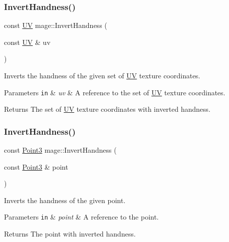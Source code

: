 \subsubsection{\texorpdfstring{Invert\+Handness()}{InvertHandness()}\hspace{0.1cm}{\footnotesize\ttfamily [1/4]}}
{\footnotesize\ttfamily const \hyperlink{structmage_1_1_u_v}{UV} mage\+::\+Invert\+Handness (\begin{DoxyParamCaption}\item[{const \hyperlink{structmage_1_1_u_v}{UV} \&}]{uv }\end{DoxyParamCaption})\hspace{0.3cm}{\ttfamily [noexcept]}}

Inverts the handness of the given set of \hyperlink{structmage_1_1_u_v}{UV} texture coordinates.


\begin{DoxyParams}[1]{Parameters}
\mbox{\tt in}  & {\em uv} & A reference to the set of \hyperlink{structmage_1_1_u_v}{UV} texture coordinates. \\
\hline
\end{DoxyParams}
\begin{DoxyReturn}{Returns}
The set of \hyperlink{structmage_1_1_u_v}{UV} texture coordinates with inverted handness. 
\end{DoxyReturn}
\hypertarget{namespacemage_acad329d95355dc4cf7835e7a0d5e5d32}{}\label{namespacemage_acad329d95355dc4cf7835e7a0d5e5d32} 
\subsubsection{\texorpdfstring{Invert\+Handness()}{InvertHandness()}\hspace{0.1cm}{\footnotesize\ttfamily [2/4]}}
{\footnotesize\ttfamily const \hyperlink{structmage_1_1_point3}{Point3} mage\+::\+Invert\+Handness (\begin{DoxyParamCaption}\item[{const \hyperlink{structmage_1_1_point3}{Point3} \&}]{point }\end{DoxyParamCaption})\hspace{0.3cm}{\ttfamily [noexcept]}}

Inverts the handness of the given point.


\begin{DoxyParams}[1]{Parameters}
\mbox{\tt in}  & {\em point} & A reference to the point. \\
\hline
\end{DoxyParams}
\begin{DoxyReturn}{Returns}
The point with inverted handness. 
\end{DoxyReturn}
\hypertarget{namespacemage_a24177301a6412c9db6ac5dccea11ec9e}{}\label{namespacemage_a24177301a6412c9db6ac5dccea11ec9e} 
